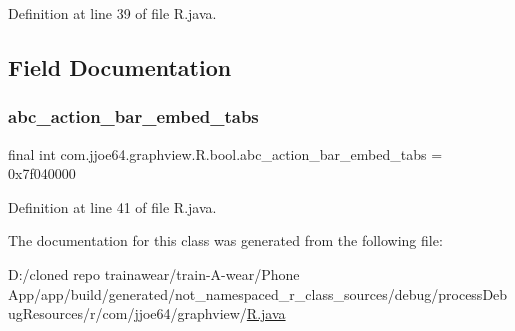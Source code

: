 Definition at line 39 of file R.\+java.


\begin{DoxyCode}{0}

\end{DoxyCode}


\subsection{Field Documentation}
\mbox{\label{classcom_1_1jjoe64_1_1graphview_1_1_r_1_1bool_ab29113a31571e3264e195fe02b515053}} 
\subsubsection{\texorpdfstring{abc\_action\_bar\_embed\_tabs}{abc\_action\_bar\_embed\_tabs}}
{\footnotesize\ttfamily final int com.\+jjoe64.\+graphview.\+R.\+bool.\+abc\+\_\+action\+\_\+bar\+\_\+embed\+\_\+tabs = 0x7f040000\hspace{0.3cm}{\ttfamily [static]}}



Definition at line 41 of file R.\+java.



The documentation for this class was generated from the following file\+:\begin{DoxyCompactItemize}
\item 
D\+:/cloned repo trainawear/train-\/\+A-\/wear/\+Phone App/app/build/generated/not\+\_\+namespaced\+\_\+r\+\_\+class\+\_\+sources/debug/process\+Debug\+Resources/r/com/jjoe64/graphview/\mbox{\hyperlink{process_debug_resources_2r_2com_2jjoe64_2graphview_2_r_8java}{R.\+java}}\end{DoxyCompactItemize}
